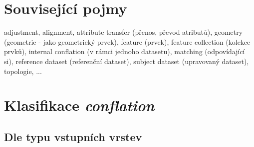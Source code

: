 \section{Související pojmy} %
\label{pojmy}

adjustment, alignment, attribute transfer (přenos, převod atributů), geometry
(geometrie - jako geometrický prvek), feature (prvek), feature collection 
(kolekce prvků), internal conflation (v rámci jednoho datasetu), matching 
(odpovídající si), reference dataset (referenční dataset), subject dataset 
(upravovaný dataset), topologie, ... 


\section{Klasifikace \textit{conflation}}
\label{klasifikace}

\subsection{Dle typu vstupních vrstev}
\label{dle-vstupu}

